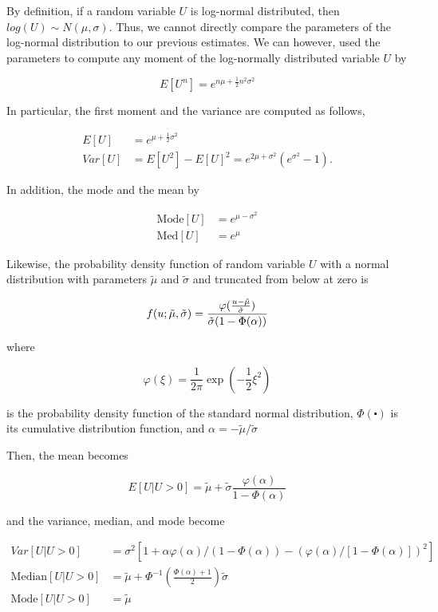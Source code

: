 \documentclass[
  12pt]{article}
\theoremstyle{definition}
\theoremstyle{remark}
\begin{document}
By definition, if a random variable \(U\) is log-normal distributed,
then \(log(U)\sim N(\mu, \sigma)\). Thus, we cannot directly compare the
parameters of the log-normal distribution to our previous estimates. We
can however, used the parameters to compute any moment of the
log-normally distributed variable \(U\) by

\[
E[U^n]=e^{n\mu+\frac{1}{2}n^2\sigma^2}
\]

In particular, the first moment and the variance are computed as
follows,

\[
\begin{aligned}  
E[U]&=e^{\mu+\frac{1}{2}\sigma^2}\\
Var[U]&=E[U^2]-E[U]^2=e^{2\mu+\sigma^2}(e^{\sigma^2}-1).
\end{aligned}
\]

In addition, the mode and the mean by

\[
\begin{aligned}
  \text{Mode}[U]&=e^{\mu-\sigma^2} \\
  \text{Med}[U]&=e^{\mu}
\end{aligned}
\]

Likewise, the probability density function of random variable \(U\) with
a normal distribution with parameters \(\tilde\mu\) and \(\tilde\sigma\)
and truncated from below at zero is

\[
  f(u\\;\tilde\mu,\tilde\sigma) = \frac{\varphi(\frac{u-\tilde\mu}{\tilde\sigma})}{\tilde\sigma (1-\Phi(\alpha))}
\]

where

\[
\varphi(\xi)=\frac{1}{2\pi}\exp(-\frac{1}{2}\xi^2)
\]

is the probability density function of the standard normal distribution,
\(\Phi(\centerdot)\) is its cumulative distribution function, and
\(\alpha=-\tilde\mu/\tilde\sigma\)

Then, the mean becomes

\[
E[U|U>0]=\tilde\mu+\tilde\sigma\frac{\varphi(\alpha)}{1-\Phi(\alpha)}
\]

and the variance, median, and mode become

\[
\begin{aligned}  
Var[U|U>0]&=\sigma^2[1+\alpha\varphi(\alpha)/(1-\Phi(\alpha))-(\varphi(\alpha)/[1-\Phi(\alpha)])^2]\\
\text{Median}[U|U>0]&=\tilde\mu+\Phi^{-1}\left(\frac{\Phi(\alpha)+1}{2}\right)\tilde\sigma \\ 
\text{Mode}[U|U>0]&=\tilde\mu
\end{aligned}
\]
\end{document}
